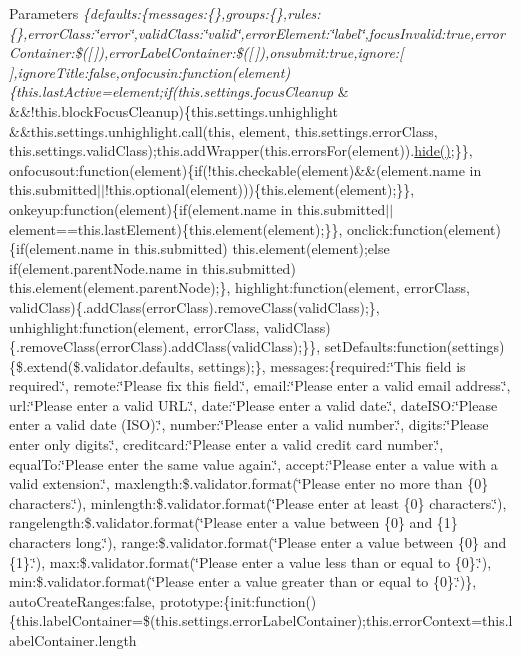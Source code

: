 \begin{DoxyParams}{Parameters}
{\em \{defaults\+:\{messages\+:\{\},groups\+:\{\},rules\+:\{\},error\+Class\+:\char`\"{}error\char`\"{},valid\+Class\+:\char`\"{}valid\char`\"{},error\+Element\+:\char`\"{}label\char`\"{},focus\+Invalid\+:true,error\+Container\+:\$(\mbox{[}$\,$\mbox{]}),error\+Label\+Container\+:\$(\mbox{[}$\,$\mbox{]}),onsubmit\+:true,ignore\+:\mbox{[}$\,$\mbox{]},ignore\+Title\+:false,onfocusin\+:function(element)\{this.\+last\+Active=element;if(this.\+settings.\+focus\+Cleanup} & \&\&!this.block\+Focus\+Cleanup)\{this.\+settings.\+unhighlight \&\&this.\+settings.\+unhighlight.\+call(this, element, this.\+settings.\+error\+Class, this.\+settings.\+valid\+Class);this.\+add\+Wrapper(this.\+errors\+For(element)).\hyperlink{jquery-1_810_82-vsdoc_8js_ab184a969b4c8542290dae744d90fd4d2}{hide()};\}\}, onfocusout\+:function(element)\{if(!this.checkable(element)\&\&(element.\+name in this.\+submitted$\vert$$\vert$!this.optional(element)))\{this.\+element(element);\}\}, onkeyup\+:function(element)\{if(element.\+name in this.\+submitted$\vert$$\vert$element==this.\+last\+Element)\{this.\+element(element);\}\}, onclick\+:function(element)\{if(element.\+name in this.\+submitted) this.\+element(element);else if(element.\+parent\+Node.\+name in this.\+submitted) this.\+element(element.\+parent\+Node);\}, highlight\+:function(element, error\+Class, valid\+Class)\{.add\+Class(error\+Class).remove\+Class(valid\+Class);\}, unhighlight\+:function(element, error\+Class, valid\+Class)\{.remove\+Class(error\+Class).add\+Class(valid\+Class);\}\}, set\+Defaults\+:function(settings)\{\$.extend(\$.validator.\+defaults, settings);\}, messages\+:\{required\+:\char`\"{}\+This field is required.\char`\"{}, remote\+:\char`\"{}\+Please fix this field.\char`\"{}, email\+:\char`\"{}\+Please enter a valid email address.\char`\"{}, url\+:\char`\"{}\+Please enter a valid U\+R\+L.\char`\"{}, date\+:\char`\"{}\+Please enter a valid date.\char`\"{}, date\+I\+S\+O\+:\char`\"{}\+Please enter a valid date (\+I\+S\+O).\char`\"{}, number\+:\char`\"{}\+Please enter a valid number.\char`\"{}, digits\+:\char`\"{}\+Please enter only digits.\char`\"{}, creditcard\+:\char`\"{}\+Please enter a valid credit card number.\char`\"{}, equal\+To\+:\char`\"{}\+Please enter the same value again.\char`\"{}, accept\+:\char`\"{}\+Please enter a value with a valid extension.\char`\"{}, maxlength\+:\$.validator.\+format(\char`\"{}\+Please enter no more than \{0\} characters.\char`\"{}), minlength\+:\$.validator.\+format(\char`\"{}\+Please enter at least \{0\} characters.\char`\"{}), rangelength\+:\$.validator.\+format(\char`\"{}\+Please enter a value between \{0\} and \{1\} characters long.\char`\"{}), range\+:\$.validator.\+format(\char`\"{}\+Please enter a value between \{0\} and \{1\}.\char`\"{}), max\+:\$.validator.\+format(\char`\"{}\+Please enter a value less than or equal to \{0\}.\char`\"{}), min\+:\$.validator.\+format(\char`\"{}\+Please enter a value greater than or equal to \{0\}.\char`\"{})\}, auto\+Create\+Ranges\+:false, prototype\+:\{init\+:function()\{this.\+label\+Container=\$(this.\+settings.\+error\+Label\+Container);this.\+error\+Context=this.\+label\+Container.\+length 
\end{DoxyParams}
